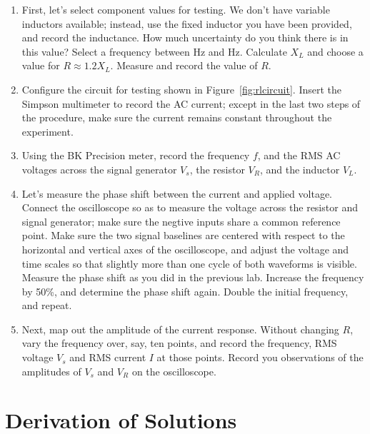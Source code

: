 \documentclass[12pt]{article}
\begin{document}
\begin{enumerate}
\item First, let's select component values for testing.  We don't have
  variable inductors available; instead, use the fixed inductor you
  have been provided, and record the inductance.  How much uncertainty
  do you think there is in this value?  Select a frequency between
  \unit[300]{Hz} and \unit[600]{Hz}.  Calculate $X_L$ and choose a
  value for $R \approx 1.2 X_L$.  Measure and record the value of $R$.
\item Configure the circuit for testing shown in
  Figure~\ref{fig:rlcircuit}.  Insert the Simpson multimeter to record
  the AC current; except in the last two steps of the procedure, make
  sure the current remains constant throughout the experiment.
\item Using the BK Precision meter, record the frequency $f$, and the
  RMS AC voltages across the signal generator $V_s$, the resistor
  $V_R$, and the inductor $V_L$.
\item \label{item:phase} Let's measure the phase shift between the
  current and applied voltage.  Connect the oscilloscope so as to
  measure the voltage across the resistor and signal generator; make
  sure the negtive inputs share a common reference point.  Make sure
  the two signal baselines are centered with respect to the horizontal
  and vertical axes of the oscilloscope, and adjust the voltage and
  time scales so that slightly more than one cycle of both waveforms
  is visible.  Measure the phase shift as you did in the previous lab.
  Increase the frequency by 50\%, and determine the phase shift again.
  Double the initial frequency, and repeat.
\item \label{item:current} Next, map out the amplitude of the current
  response.  Without changing $R$, vary the frequency over, say, ten
  points, and record the frequency, RMS voltage $V_s$ and RMS current
  $I$ at those points.  Record you observations of the amplitudes of
  $V_s$ and $V_R$ on the oscilloscope.
\end{enumerate}


\appendix

\section{Derivation of Solutions}
\label{sec:solutions}
\end{document}

